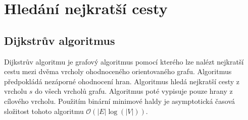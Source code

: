 %
%

\chapter{Hledání nejkratší cesty}

\section{Dijkstrův algoritmus}

Dijkstrův algoritmu je grafový algoritmus pomocí kterého lze nalézt nejkratší cestu mezi dvěma vrcholy ohodnoceného orientovaného grafu. Algoritmus předpokládá nezáporné ohodnocení hran. Algoritmus hledá nejkratší cesty z vrcholu $s$ do všech vrcholů grafu. Algoritmus poté vypisuje pouze hrany z cílového vrcholu. Použitím binární minimové haldy je asymptotická časová složitost tohoto algoritmu $\mathcal{O}(|E|\log(|V|))$.

